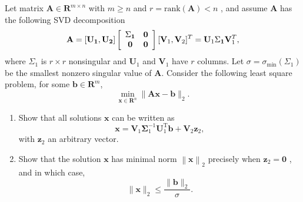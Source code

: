 \begin{exercise}
\label{applied:2021:4}
Let matrix $\mathbf { A } \in \mathbf { R } ^ { m \times n }$ with $m \geq n$ and $r = \mathrm { rank } ( \mathbf { A } ) < n$ , and assume $\mathbf{A}$ has the following SVD decomposition
\[
\mathbf {A} = [ \mathbf {U _ {1}}, \mathbf {U _ {2}} ] \left[ \begin{array}{c c} \Sigma_ {\mathbf {1}} & \mathbf {0} \\ \mathbf {0} & \mathbf {0} \end{array} \right] [ \mathbf {V} _ {1}, \mathbf {V} _ {2} ] ^ {T} = \mathbf {U} _ {1} \Sigma_ {\mathbf {1}} \mathbf {V} _ {1} ^ {T},
\]
where $\Sigma _ { 1 }$ is $r \times r$ nonsingular and $\mathbf { U } _ { 1 }$ and $\mathbf { V } _ { 1 }$ have $r$ columns. Let $\sigma = \sigma _ { \mathrm { m i n } } ( \Sigma _ { 1 } )$ be the smallest nonzero singular value of $\mathbf{A}$. Consider the following least square problem, for some $\mathbf{b} \in \mathbf{R}^m$,
\[
\min  _ {\mathbf {x} \in \mathbf {R} ^ {n}} \| \mathbf {A x} - \mathbf {b} \| _ {2}.
\]

\begin{enumerate}
\item[(a)] Show that all solutions $\mathbf{x}$ can be written as
\[
\mathbf {x} = \mathbf {V} _ {1} \boldsymbol {\Sigma} _ {1} ^ {- 1} \mathbf {U} _ {1} ^ {\mathrm {T}} \mathbf {b} + \mathbf {V} _ {2} \mathbf {z} _ {2},
\]
with $\mathbf { z } _ { 2 }$ an arbitrary vector.

\item[(b)] Show that the solution $\mathbf{x}$ has minimal norm $\left\| \mathbf { x } \right\| _ { 2 }$ precisely when $\mathbf { z } _ { 2 } = \mathbf { 0 }$ , and in which case,
\[
\| \mathbf {x} \| _ {2} \leq \frac {\| \mathbf {b} \| _ {2}}{\sigma}.
\]
\end{enumerate}
\end{exercise}

